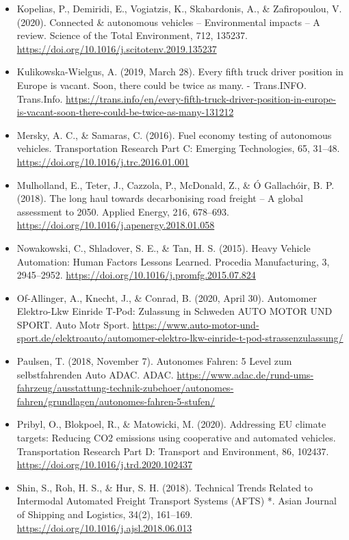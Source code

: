\documentclass[
]{book}
\begin{document}
\begin{itemize}
\item
  Kopelias, P., Demiridi, E., Vogiatzis, K., Skabardonis, A., \& Zafiropoulou, V. (2020). Connected \& autonomous vehicles -- Environmental impacts -- A review. Science of the Total Environment, 712, 135237. \url{https://doi.org/10.1016/j.scitotenv.2019.135237}
\item
  Kulikowska-Wielgus, A. (2019, March 28). Every fifth truck driver position in Europe is vacant. Soon, there could be twice as many. - Trans.INFO. Trans.Info. \url{https://trans.info/en/every-fifth-truck-driver-position-in-europe-is-vacant-soon-there-could-be-twice-as-many-131212}
\item
  Mersky, A. C., \& Samaras, C. (2016). Fuel economy testing of autonomous vehicles. Transportation Research Part C: Emerging Technologies, 65, 31--48. \url{https://doi.org/10.1016/j.trc.2016.01.001}
\item
  Mulholland, E., Teter, J., Cazzola, P., McDonald, Z., \& Ó Gallachóir, B. P. (2018). The long haul towards decarbonising road freight -- A global assessment to 2050. Applied Energy, 216, 678--693. \url{https://doi.org/10.1016/j.apenergy.2018.01.058}
\item
  Nowakowski, C., Shladover, S. E., \& Tan, H. S. (2015). Heavy Vehicle Automation: Human Factors Lessons Learned. Procedia Manufacturing, 3, 2945--2952. \url{https://doi.org/10.1016/j.promfg.2015.07.824}
\item
  Of-Allinger, A., Knecht, J., \& Conrad, B. (2020, April 30). Automomer Elektro-Lkw Einride T-Pod: Zulassung in Schweden \textbar{} AUTO MOTOR UND SPORT. Auto Motr Sport. \url{https://www.auto-motor-und-sport.de/elektroauto/automomer-elektro-lkw-einride-t-pod-strassenzulassung/}
\item
  Paulsen, T. (2018, November 7). Autonomes Fahren: 5 Level zum selbstfahrenden Auto \textbar{} ADAC. ADAC. \url{https://www.adac.de/rund-ums-fahrzeug/ausstattung-technik-zubehoer/autonomes-fahren/grundlagen/autonomes-fahren-5-stufen/}
\item
  Pribyl, O., Blokpoel, R., \& Matowicki, M. (2020). Addressing EU climate targets: Reducing CO2 emissions using cooperative and automated vehicles. Transportation Research Part D: Transport and Environment, 86, 102437. \url{https://doi.org/10.1016/j.trd.2020.102437}
\item
  Shin, S., Roh, H. S., \& Hur, S. H. (2018). Technical Trends Related to Intermodal Automated Freight Transport Systems (AFTS) *. Asian Journal of Shipping and Logistics, 34(2), 161--169. \url{https://doi.org/10.1016/j.ajsl.2018.06.013}

\end{itemize}
\end{document}
